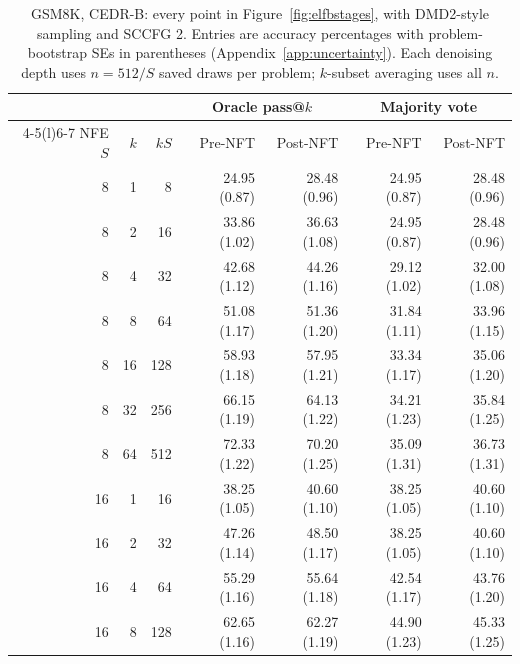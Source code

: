 \documentclass[11pt,letterpaper]{article}
\begin{document}
\begin{table}[!htbp]
\caption{GSM8K, CEDR-B: every point in Figure~\ref{fig:elfbstages}, with DMD2-style sampling and SCCFG 2. Entries are accuracy percentages with problem-bootstrap SEs in parentheses (Appendix~\ref{app:uncertainty}). Each denoising depth uses $n=512/S$ saved draws per problem; $k$-subset averaging uses all $n$.}
\label{tab:budgetvaluesgsmb}
\centering\small
\setlength{\tabcolsep}{5pt}
\begin{tabular}{@{}rrr rrrr@{}}
\toprule
& & & \multicolumn{2}{c}{Oracle pass@$k$} & \multicolumn{2}{c}{Majority vote} \\
\cmidrule(lr){4-5}\cmidrule(l){6-7}
NFE $S$ & $k$ & $kS$ & Pre-NFT & Post-NFT & Pre-NFT & Post-NFT \\
\midrule
8 & 1 & 8 & 24.95 {\scriptsize (0.87)} & 28.48 {\scriptsize (0.96)} & 24.95 {\scriptsize (0.87)} & 28.48 {\scriptsize (0.96)} \\
8 & 2 & 16 & 33.86 {\scriptsize (1.02)} & 36.63 {\scriptsize (1.08)} & 24.95 {\scriptsize (0.87)} & 28.48 {\scriptsize (0.96)} \\
8 & 4 & 32 & 42.68 {\scriptsize (1.12)} & 44.26 {\scriptsize (1.16)} & 29.12 {\scriptsize (1.02)} & 32.00 {\scriptsize (1.08)} \\
8 & 8 & 64 & 51.08 {\scriptsize (1.17)} & 51.36 {\scriptsize (1.20)} & 31.84 {\scriptsize (1.11)} & 33.96 {\scriptsize (1.15)} \\
8 & 16 & 128 & 58.93 {\scriptsize (1.18)} & 57.95 {\scriptsize (1.21)} & 33.34 {\scriptsize (1.17)} & 35.06 {\scriptsize (1.20)} \\
8 & 32 & 256 & 66.15 {\scriptsize (1.19)} & 64.13 {\scriptsize (1.22)} & 34.21 {\scriptsize (1.23)} & 35.84 {\scriptsize (1.25)} \\
8 & 64 & 512 & 72.33 {\scriptsize (1.22)} & 70.20 {\scriptsize (1.25)} & 35.09 {\scriptsize (1.31)} & 36.73 {\scriptsize (1.31)} \\
\midrule
16 & 1 & 16 & 38.25 {\scriptsize (1.05)} & 40.60 {\scriptsize (1.10)} & 38.25 {\scriptsize (1.05)} & 40.60 {\scriptsize (1.10)} \\
16 & 2 & 32 & 47.26 {\scriptsize (1.14)} & 48.50 {\scriptsize (1.17)} & 38.25 {\scriptsize (1.05)} & 40.60 {\scriptsize (1.10)} \\
16 & 4 & 64 & 55.29 {\scriptsize (1.16)} & 55.64 {\scriptsize (1.18)} & 42.54 {\scriptsize (1.17)} & 43.76 {\scriptsize (1.20)} \\
16 & 8 & 128 & 62.65 {\scriptsize (1.16)} & 62.27 {\scriptsize (1.19)} & 44.90 {\scriptsize (1.23)} & 45.33 {\scriptsize (1.25)} \\

\end{tabular}
\end{table}
\end{document}
